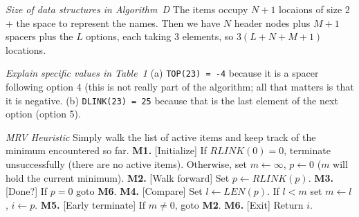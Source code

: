  {\it Size of data structures in Algorithm~D}\hfil\break
The items occupy $N+1$ locaions of size 2 + the space to represent the names.
Then we have $N$ header nodes plus $M+1$ spacers plus the $L$ options,
each taking 3 elements, so $3\left(L + N + M + 1\right)$ locations.

 {\it Explain specific values in Table~1}\hfil\break
(a) {\tt TOP(23) = -4} because it is a spacer following option 4 (this is not
really part of the algorithm; all that matters is that it is negative.\hfil\break
(b) {\tt DLINK(23) = 25} because that is the last element of the next option
(option 5).

 {\it MRV Heuristic}\hfil\break
Simply walk the list of active items and keep track of the minimum encountered
so far.\hfil\break
{\bf M1.} [Initialize] If $RLINK\left(0\right) = 0$, terminate unsuccessfully (there are no
 active items).  Otherwise, set $m \leftarrow \infty$, $p \leftarrow 0$ ($m$ will hold
 the current minimum).\hfil\break
{\bf M2.} [Walk forward] Set $p \leftarrow RLINK\left(p\right)$.\hfil\break
{\bf M3.} [Done?] If $p = 0$ goto {\bf M6}.\hfil\break
{\bf M4.} [Compare] Set $l \leftarrow LEN\left(p\right)$.  If $l < m$ set $m \leftarrow l$,
 $i \leftarrow p$.\hfil\break
{\bf M5.} [Early terminate] If $m \ne 0$, goto {\bf M2}.\hfil\break
{\bf M6.} [Exit] Return $i$.\hfil\break

\bye